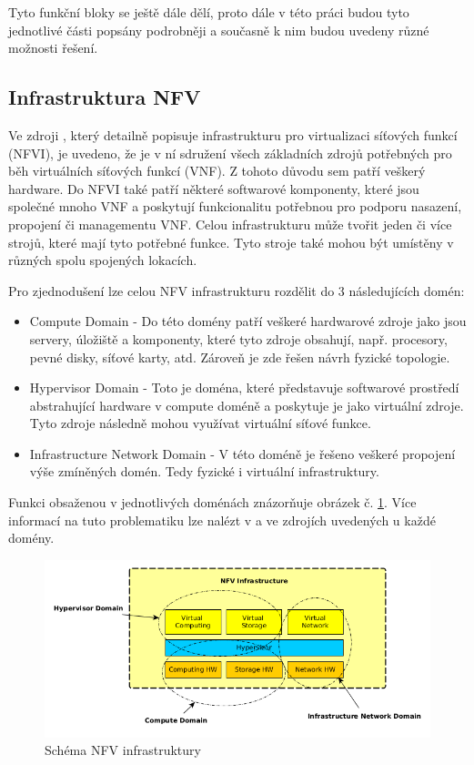 Tyto funkční bloky se ještě dále dělí, proto dále v této práci budou tyto jednotlivé části popsány podrobněji a současně k nim budou uvedeny různé možnosti řešení.

\subsection{Infrastruktura NFV}

Ve zdroji \cite{NFV_infrastructure}, který detailně popisuje infrastrukturu pro virtualizaci síťových funkcí (NFVI), je uvedeno, že je v ní sdružení všech základních zdrojů potřebných pro běh virtuálních síťových funkcí (VNF). Z tohoto důvodu sem patří veškerý hardware. Do NFVI také patří některé softwarové komponenty, které jsou společné mnoho VNF a poskytují funkcionalitu potřebnou pro podporu nasazení, propojení či managementu VNF. Celou infrastrukturu může tvořit jeden či více strojů, které mají tyto potřebné funkce. Tyto stroje také mohou být umístěny v různých spolu spojených lokacích. 

Pro zjednodušení lze celou NFV infrastrukturu rozdělit do 3 následujících domén:

\begin{itemize}
\item Compute Domain - Do této domény patří veškeré hardwarové zdroje jako jsou servery, úložiště a komponenty, které tyto zdroje obsahují, např. procesory, pevné disky, síťové karty, atd. Zároveň je zde řešen návrh fyzické topologie. \cite{NFV_compute}
\item Hypervisor Domain - Toto je doména, které představuje softwarové prostředí abstrahující hardware v compute doméně a poskytuje je jako virtuální zdroje. Tyto zdroje následně mohou využívat virtuální síťové funkce. \cite{NFV_hypervisor}
\item Infrastructure Network Domain - V této doméně je řešeno veškeré propojení výše zmíněných domén. Tedy fyzické i virtuální infrastruktury.\cite{NFV_network}
\end{itemize}

Funkci obsaženou v jednotlivých doménách znázorňuje obrázek č. \ref{fig:infrastruktura}. Více informací na tuto problematiku lze nalézt v \cite{NFV_infrastructure} a ve zdrojích uvedených u každé domény. 

\begin{figure}[h]
\begin{centering}
\includegraphics[scale=0.65]{images/infrastruktura}
\par\end{centering}
\caption{Schéma NFV infrastruktury\label{fig:infrastruktura}}
\end{figure}

